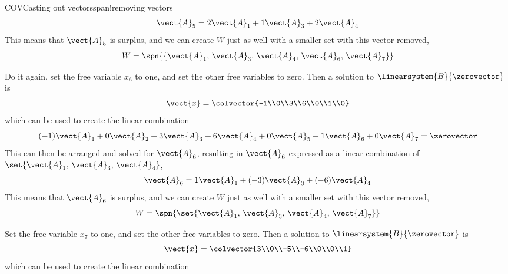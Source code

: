 \begin{example}{COV}{Casting out vectors}{span!removing vectors}
%
\begin{equation*}
\vect{A}_5=
2\vect{A}_1+
1\vect{A}_3+
2\vect{A}_4
\end{equation*}
%
This means that $\vect{A}_5$ is surplus, and we can create $W$ just as well with a smaller set with  this vector removed,
%
%
\begin{equation*}
W=\spn{\left\{\vect{A}_1,\,\vect{A}_3,\,\vect{A}_4,\,\vect{A}_6,\,\vect{A}_7\right\}}
\end{equation*}
%
\par
%
Do it again, set the free variable $x_6$ to one, and set the other free variables to zero.  Then a solution to $\linearsystem{B}{\zerovector}$ is
%
\begin{equation*}
\vect{x}=\colvector{-1\\0\\3\\6\\0\\1\\0}
\end{equation*}
%
which can be used to create the linear combination
%
\begin{equation*}
(-1)\vect{A}_1+
0\vect{A}_2+
3\vect{A}_3+
6\vect{A}_4+
0\vect{A}_5+
1\vect{A}_6+
0\vect{A}_7
=\zerovector
\end{equation*}
%
This can then be arranged and solved for $\vect{A}_6$, resulting in $\vect{A}_6$ expressed as a linear combination of $\set{\vect{A}_1,\,\vect{A}_3,\,\vect{A}_4}$,
%
\begin{equation*}
\vect{A}_6=
1\vect{A}_1+
(-3)\vect{A}_3+
(-6)\vect{A}_4
\end{equation*}
%
This means that $\vect{A}_6$ is surplus, and we can create $W$ just as well with a smaller set with  this vector removed,
%
%
\begin{equation*}
W=\spn{\set{\vect{A}_1,\,\vect{A}_3,\,\vect{A}_4,\,\vect{A}_7}}
\end{equation*}
%
\par
%
Set the free variable $x_7$ to one, and set the other free variables to zero.  Then a solution to $\linearsystem{B}{\zerovector}$ is
%
\begin{equation*}
\vect{x}=\colvector{3\\0\\-5\\-6\\0\\0\\1}
\end{equation*}
%
which can be used to create the linear combination

\end{example}
